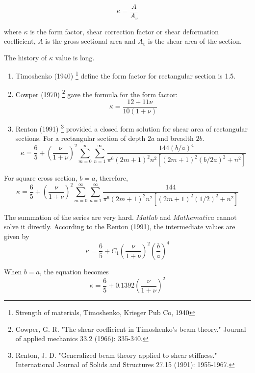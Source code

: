 \documentclass[fleqn,11pt]{article}
\begin{document}
\begin{equation}
  \kappa = \frac{A}{A_v}
\end{equation}

where $\kappa$ is the form factor, shear correction factor or shear deformation coefficient, $A$ is the gross sectional area and $A_v$ is the shear area of the section. 

The history of $\kappa$ value is long. 
\begin{enumerate}
  \item Timoshenko (1940) \footnote{Strength of materials, Timoshenko, Krieger Pub Co, 1940} define the form factor for rectangular section is 1.5. 
  \item Cowper (1970) \footnote{Cowper, G. R. "The shear coefficient in Timoshenko’s beam theory." Journal of applied mechanics 33.2 (1966): 335-340.} gave the formula for the form factor:
    \begin{equation}
      \kappa=\frac{12+11\nu}{10(1+\nu)}
    \end{equation}
  \item Renton (1991) \footnote{Renton, J. D. "Generalized beam theory applied to shear stiffness." International Journal of Solids and Structures 27.15 (1991): 1955-1967.}  provided a closed form solution for shear area of rectangular sections. For a rectangular section of depth $2a$ and breadth $2b$.
    \begin{equation}
      \kappa=\frac{6}{5}+ (\frac{\nu}{1+\nu})^2 \sum_{m=0}^{\infty}\sum_{n=1}^{\infty} \frac{144(b/a)^4}{\pi^6 (2m+1)^2 n^2 [(2m+1)^2(b/2a)^2+n^2]}
    \end{equation}
\end{enumerate}





For square cross section, $b=a$, therefore, 
\begin{equation}
  \kappa= \frac{6}{5}+ (\frac{\nu}{1+\nu})^2 \sum_{m=0}^{\infty}\sum_{n=1}^{\infty} \frac{144}{\pi^6 (2m+1)^2 n^2 [(2m+1)^2(1/2)^2+n^2]}
\end{equation}

The summation of the series are very hard. $Matlab$ and $Mathematica$ cannot solve it directly. According to the Renton (1991), the intermediate values are given by
\begin{equation}
  \kappa=\frac{6}{5}+ C_1 (\frac{\nu}{1+\nu})^2 (\frac{b}{a})^4
\end{equation}

When $b=a$, the equation becomes
\begin{equation}
  \kappa=\frac{6}{5}+ 0.1392 (\frac{\nu}{1+\nu})^2 
\end{equation}
\end{document}
